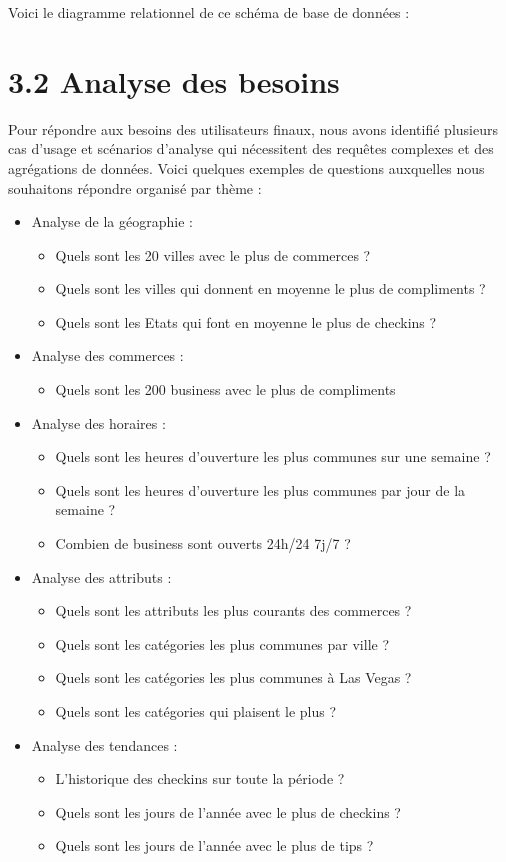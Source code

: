 Voici le diagramme relationnel de ce schéma de base de données :

\section*{3.2 Analyse des besoins}

Pour répondre aux besoins des utilisateurs finaux, nous avons identifié plusieurs cas d’usage et scénarios d’analyse qui nécessitent des requêtes complexes et des agrégations de données.
Voici quelques exemples de questions auxquelles nous souhaitons répondre organisé par thème :

\begin{itemize}
\item Analyse de la géographie :
\begin{itemize}
\item Quels sont les 20 villes avec le plus de commerces ?
\item Quels sont les villes qui donnent en moyenne le plus de compliments ?
\item Quels sont les Etats qui font en moyenne le plus de checkins ?
\end{itemize}
\item Analyse des commerces :
\begin{itemize}
\item Quels sont les 200 business avec le plus de compliments
\end{itemize}
\item Analyse des horaires :
\begin{itemize}
\item Quels sont les heures d'ouverture les plus communes sur une semaine ?
\item Quels sont les heures d'ouverture les plus communes par jour de la semaine ?
\item Combien de business sont ouverts 24h/24 7j/7 ?
\end{itemize}
\item Analyse des attributs :
\begin{itemize}
\item Quels sont les attributs les plus courants des commerces ?
\item Quels sont les catégories les plus communes par ville ?
\item Quels sont les catégories les plus communes à Las Vegas ?
\item Quels sont les catégories qui plaisent le plus ?
\end{itemize}
\item Analyse des tendances :
\begin{itemize}
\item L'historique des checkins sur toute la période ?
\item Quels sont les jours de l'année avec le plus de checkins ?
\item Quels sont les jours de l'année avec le plus de tips ?
\end{itemize}
\end{itemize}

